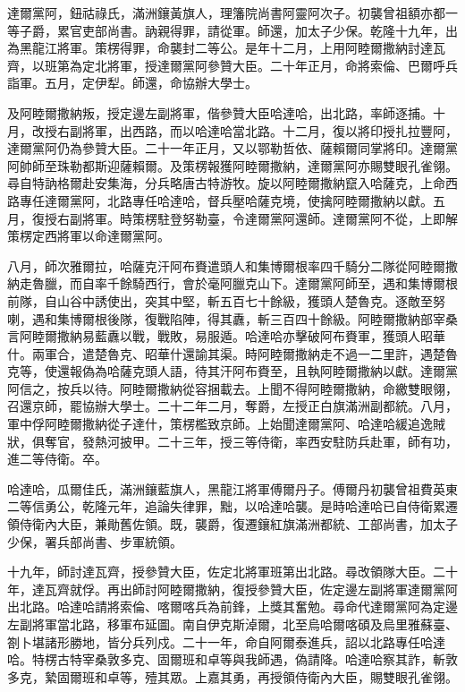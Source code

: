 \begin{pinyinscope}
達爾黨阿，鈕祜祿氏，滿洲鑲黃旗人，理籓院尚書阿靈阿次子。初襲曾祖額亦都一等子爵，累官吏部尚書。訥親得罪，請從軍。師還，加太子少保。乾隆十九年，出為黑龍江將軍。策楞得罪，命襲封二等公。是年十二月，上用阿睦爾撒納討達瓦齊，以班第為定北將軍，授達爾黨阿參贊大臣。二十年正月，命將索倫、巴爾呼兵詣軍。五月，定伊犁。師還，命協辦大學士。

及阿睦爾撒納叛，授定邊左副將軍，偕參贊大臣哈達哈，出北路，率師逐捕。十月，改授右副將軍，出西路，而以哈達哈當北路。十二月，復以將印授扎拉豐阿，達爾黨阿仍為參贊大臣。二十一年正月，又以鄂勒哲依、薩賴爾同掌將印。達爾黨阿帥師至珠勒都斯迎薩賴爾。及策楞報獲阿睦爾撒納，達爾黨阿亦賜雙眼孔雀翎。尋自特訥格爾赴安集海，分兵略唐古特游牧。旋以阿睦爾撒納竄入哈薩克，上命西路專任達爾黨阿，北路專任哈達哈，督兵壓哈薩克境，使擒阿睦爾撒納以獻。五月，復授右副將軍。時策楞駐登努勒臺，令達爾黨阿還師。達爾黨阿不從，上即解策楞定西將軍以命達爾黨阿。

八月，師次雅爾拉，哈薩克汗阿布賚遣頭人和集博爾根率四千騎分二隊從阿睦爾撒納走魯臘，而自率千餘騎西行，會於毫阿臘克山下。達爾黨阿師至，遇和集博爾根前隊，自山谷中誘使出，突其中堅，斬五百七十餘級，獲頭人楚魯克。逐敵至努喇，遇和集博爾根後隊，復戰陷陣，得其纛，斬三百四十餘級。阿睦爾撒納部宰桑言阿睦爾撒納易藍纛以戰，戰敗，易服遁。哈達哈亦擊破阿布賚軍，獲頭人昭華什。兩軍合，遣楚魯克、昭華什還諭其渠。時阿睦爾撒納走不過一二里許，遇楚魯克等，使還報偽為哈薩克頭人語，待其汗阿布賚至，且執阿睦爾撒納以獻。達爾黨阿信之，按兵以待。阿睦爾撒納從容捆載去。上聞不得阿睦爾撒納，命繳雙眼翎，召還京師，罷協辦大學士。二十二年二月，奪爵，左授正白旗滿洲副都統。八月，軍中俘阿睦爾撒納從子達什，策楞檻致京師。上始聞達爾黨阿、哈達哈緩追逸賊狀，俱奪官，發熱河披甲。二十三年，授三等侍衛，率西安駐防兵赴軍，師有功，進二等侍衛。卒。

哈達哈，瓜爾佳氏，滿洲鑲藍旗人，黑龍江將軍傅爾丹子。傅爾丹初襲曾祖費英東二等信勇公，乾隆元年，追論失律罪，黜，以哈達哈襲。是時哈達哈已自侍衛累遷領侍衛內大臣，兼勛舊佐領。既，襲爵，復遷鑲紅旗滿洲都統、工部尚書，加太子少保，署兵部尚書、步軍統領。

十九年，師討達瓦齊，授參贊大臣，佐定北將軍班第出北路。尋改領隊大臣。二十年，達瓦齊就俘。再出師討阿睦爾撒納，復授參贊大臣，佐定邊左副將軍達爾黨阿出北路。哈達哈請將索倫、喀爾喀兵為前鋒，上獎其奮勉。尋命代達爾黨阿為定邊左副將軍當北路，移軍布延圖。南自伊克斯淖爾，北至烏哈爾喀碩及烏里雅蘇臺、劄卜堪諸形勝地，皆分兵列戍。二十一年，命自阿爾泰進兵，詔以北路專任哈達哈。特楞古特宰桑敦多克、固爾班和卓等與我師遇，偽請降。哈達哈察其詐，斬敦多克，縶固爾班和卓等，殪其眾。上嘉其勇，再授領侍衛內大臣，賜雙眼孔雀翎。


\end{pinyinscope}
